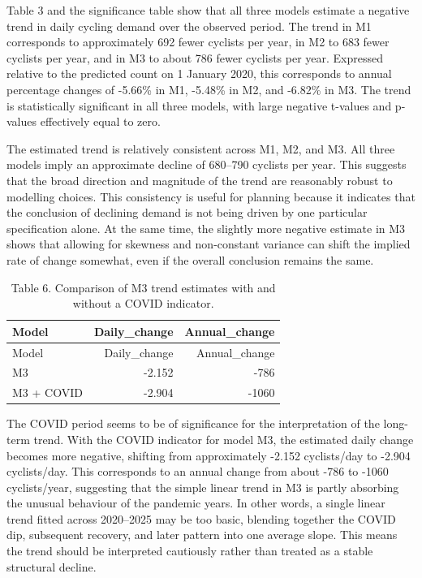 \documentclass[
]{article}
\begin{document}
Table 3 and the significance table show that all three models estimate a
negative trend in daily cycling demand over the observed period. The
trend in M1 corresponds to approximately 692 fewer cyclists per year, in
M2 to 683 fewer cyclists per year, and in M3 to about 786 fewer cyclists
per year. Expressed relative to the predicted count on 1 January 2020,
this corresponds to annual percentage changes of -5.66\% in M1, -5.48\%
in M2, and -6.82\% in M3. The trend is statistically significant in all
three models, with large negative t-values and p-values effectively
equal to zero.

The estimated trend is relatively consistent across M1, M2, and M3. All
three models imply an approximate decline of 680--790 cyclists per year.
This suggests that the broad direction and magnitude of the trend are
reasonably robust to modelling choices. This consistency is useful for
planning because it indicates that the conclusion of declining demand is
not being driven by one particular specification alone. At the same
time, the slightly more negative estimate in M3 shows that allowing for
skewness and non-constant variance can shift the implied rate of change
somewhat, even if the overall conclusion remains the same.

\begin{longtable}[]{@{}lrr@{}}
\caption{Table 6. Comparison of M3 trend estimates with and without a
COVID indicator.}\tabularnewline
\toprule\noalign{}
Model & Daily\_change & Annual\_change \\
\midrule\noalign{}
\endfirsthead
\toprule\noalign{}
Model & Daily\_change & Annual\_change \\
\midrule\noalign{}
\endhead
\bottomrule\noalign{}
\endlastfoot
M3 & -2.152 & -786 \\
M3 + COVID & -2.904 & -1060 \\
\end{longtable}

The COVID period seems to be of significance for the interpretation of
the long-term trend. With the COVID indicator for model M3, the
estimated daily change becomes more negative, shifting from
approximately -2.152 cyclists/day to -2.904 cyclists/day. This
corresponds to an annual change from about -786 to -1060 cyclists/year,
suggesting that the simple linear trend in M3 is partly absorbing the
unusual behaviour of the pandemic years. In other words, a single linear
trend fitted across 2020--2025 may be too basic, blending together the
COVID dip, subsequent recovery, and later pattern into one average
slope. This means the trend should be interpreted cautiously rather than
treated as a stable structural decline.
\end{document}

